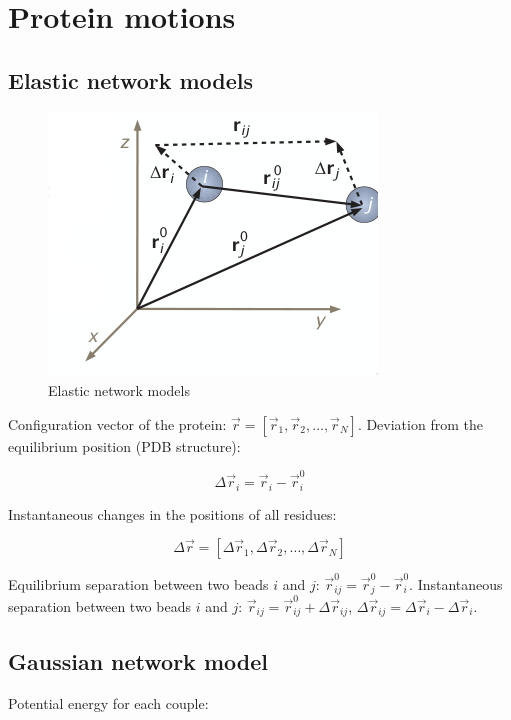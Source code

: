 \graphicspath{{chapters/15/images}}
\chapter{Protein motions}

\section{Elastic network models}

\begin{figure}[H]
	\includegraphics[width=\textwidth]{enm-theory}
	\caption{Elastic network models}
	\label{fig:kirchhoff-adjacency}
\end{figure}

Configuration vector of the protein: $\vec{r} = [\vec{r}_1, \vec{r}_2, \dots, \vec{r}_N]$.
Deviation from the equilibrium position (PDB structure):

$$\Delta\vec{r}_i = \vec{r}_i-\vec{r}_i^0$$

Instantaneous changes in the positions of all residues:

$$\Delta\vec{r} = [\Delta\vec{r}_1, \Delta\vec{r}_2, \dots, \Delta\vec{r}_N]$$


Equilibrium separation between two beads $i$ and $j$: $\vec{r}_{ij}^0 = \vec{r}_j^0-\vec{r}_i^0$.
Instantaneous separation between two beads $i$ and $j$: $\vec{r}_{ij} = \vec{r}_{ij}^0+\Delta\vec{r}_{ij}$, $\Delta\vec{r}_{ij} = \Delta\vec{r}_i-\Delta\vec{r}_i$.

\section{Gaussian network model}
Potential energy for each couple:

